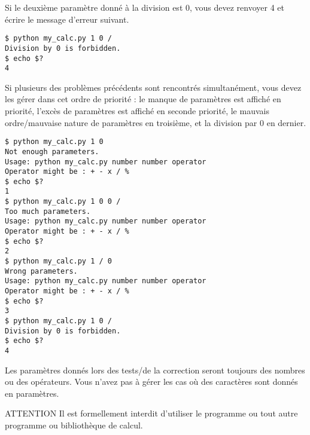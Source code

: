 \bigskip

\noindent Si le deuxième paramètre donné à la division est 0, vous devez renvoyer 4 et écrire le message d'erreur suivant.

\bigskip

\noindent {}

\bigskip

\lstset{language=sh}
\begin{lstlisting}[frame=single,title={Cas d'erreur 4 : division par 0}]
$ python my_calc.py 1 0 /
Division by 0 is forbidden.
$ echo $?
4
\end{lstlisting}

\bigskip

\noindent Si plusieurs des problèmes précédents sont rencontrés simultanément, vous devez les gérer dans cet ordre de priorité : le manque de paramètres est affiché en priorité, l'excès de paramètres est affiché en seconde priorité, le mauvais ordre/mauvaise nature de paramètres en troisième, et la division par 0 en dernier.

\bigskip

\lstset{language=sh}
\begin{lstlisting}[frame=single,title={Cas d'erreurs : ordre des erreurs}]
$ python my_calc.py 1 0
Not enough parameters.
Usage: python my_calc.py number number operator
Operator might be : + - x / %
$ echo $?
1
$ python my_calc.py 1 0 0 /
Too much parameters.
Usage: python my_calc.py number number operator
Operator might be : + - x / %
$ echo $?
2
$ python my_calc.py 1 / 0
Wrong parameters.
Usage: python my_calc.py number number operator
Operator might be : + - x / %
$ echo $?
3
$ python my_calc.py 1 0 /
Division by 0 is forbidden.
$ echo $?
4
\end{lstlisting}

\bigskip

\noindent Les paramètres donnés lors des tests/de la correction seront toujours des nombres ou des opérateurs.
Vous n'avez pas à gérer les cas où des caractères sont donnés en paramètres.

\bigskip

\begin{RedBoxTitle}{ATTENTION}
    Il est formellement interdit d'utiliser le programme  ou tout autre programme ou bibliothèque de calcul.
\end{RedBoxTitle}